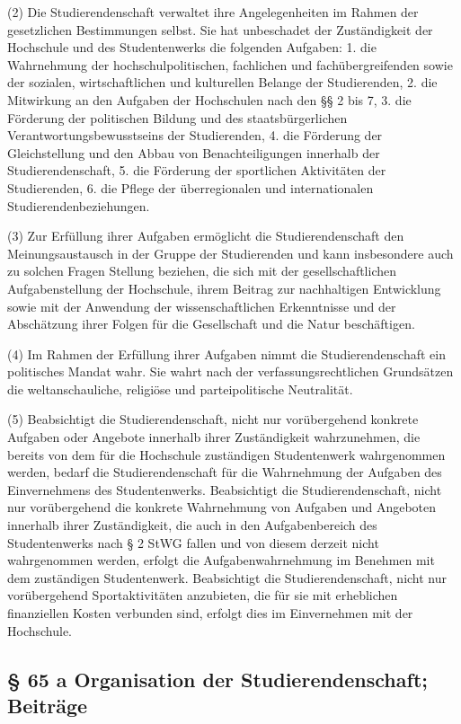 \documentclass[
10pt,
a4paper,
twoside,								%
titlepage=false,							%
draft=false								%
]{scrartcl}
\begin{document}
(2) Die Studierendenschaft verwaltet ihre Angelegenheiten im Rahmen der gesetzlichen Bestimmungen selbst. Sie hat unbeschadet der Zuständigkeit der Hochschule und des Studentenwerks die folgenden Aufgaben:
1. die Wahrnehmung der hochschulpolitischen, fachlichen und fachübergreifenden sowie der sozialen, wirtschaftlichen und kulturellen Belange der Studierenden,
2. die Mitwirkung an den Aufgaben der Hochschulen nach den §§ 2 bis 7,
3. die Förderung der politischen Bildung und des staatsbürgerlichen Verantwortungsbewusstseins der Studierenden,
4. die Förderung der Gleichstellung und den Abbau von Benachteiligungen innerhalb der Studierendenschaft,
5. die Förderung der sportlichen Aktivitäten der Studierenden,
6. die Pflege der überregionalen und internationalen Studierendenbeziehungen.

(3) Zur Erfüllung ihrer Aufgaben ermöglicht die Studierendenschaft den Meinungsaustausch in der Gruppe der Studierenden und kann insbesondere auch zu solchen Fragen Stellung beziehen, die sich mit der gesellschaftlichen Aufgabenstellung der Hochschule, ihrem Beitrag zur nachhaltigen Entwicklung sowie mit der Anwendung der wissenschaftlichen Erkenntnisse und der Abschätzung ihrer Folgen für die Gesellschaft und die Natur beschäftigen.

(4) Im Rahmen der Erfüllung ihrer Aufgaben nimmt die Studierendenschaft ein politisches Mandat wahr. Sie wahrt nach der verfassungsrechtlichen Grundsätzen die weltanschauliche, religiöse und parteipolitische Neutralität.

(5) Beabsichtigt die Studierendenschaft, nicht nur vorübergehend konkrete Aufgaben oder Angebote innerhalb ihrer Zuständigkeit wahrzunehmen, die bereits von dem für die Hochschule zuständigen Studentenwerk wahrgenommen werden, bedarf die Studierendenschaft für die Wahrnehmung der Aufgaben des Einvernehmens des Studentenwerks. Beabsichtigt die Studierendenschaft, nicht nur vorübergehend die konkrete Wahrnehmung von Aufgaben und Angeboten innerhalb ihrer Zuständigkeit, die auch in den Aufgabenbereich des Studentenwerks nach § 2 StWG fallen und von diesem derzeit nicht wahrgenommen werden, erfolgt die Aufgabenwahrnehmung im Benehmen mit dem zuständigen Studentenwerk. Beabsichtigt die Studierendenschaft, nicht nur vorübergehend Sportaktivitäten anzubieten, die für sie mit erheblichen finanziellen Kosten verbunden sind, erfolgt dies im Einvernehmen mit der Hochschule.


\subsection{§ 65 a Organisation der Studierendenschaft; Beiträge}
\end{document}
